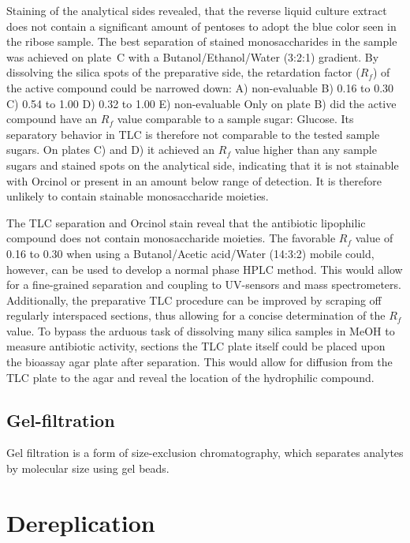 Staining of the analytical sides revealed, that the reverse liquid culture extract does not contain a significant amount of pentoses to adopt the blue color seen in the ribose sample.
The best separation of stained monosaccharides in the sample was achieved on plate~C with a Butanol/Ethanol/Water (3:2:1) gradient.
By dissolving the silica spots of the preparative side, the retardation factor ($R_f$) of the active compound could be narrowed down:
	 A) non-evaluable
	 B) 0.16 to 0.30
	 C) 0.54 to 1.00
	 D) 0.32 to 1.00
	 E) non-evaluable
Only on plate B) did the active compound have an $R_f$ value comparable to a sample sugar: Glucose.
Its separatory behavior in TLC is therefore not comparable to the tested sample sugars.
On plates C) and D) it achieved an $R_f$ value higher than any sample sugars and stained spots on the analytical side, indicating that it is not stainable with Orcinol or present in an amount below range of detection.
It is therefore unlikely to contain stainable monosaccharide moieties.

The TLC separation and Orcinol stain reveal that the antibiotic lipophilic compound does not contain monosaccharide moieties.
The favorable $R_f$ value of 0.16 to 0.30 when using a Butanol/Acetic acid/Water (14:3:2) mobile could, however, can be used to develop a normal phase HPLC method.
This would allow for a fine-grained separation and coupling to UV-sensors and mass spectrometers.
Additionally, the preparative TLC procedure can be improved by scraping off regularly interspaced sections, thus allowing for a concise determination of the $R_f$ value.
To bypass the arduous task of dissolving many silica samples in MeOH to measure antibiotic activity, sections the TLC plate itself could be placed upon the bioassay agar plate after separation.
This would allow for diffusion from the TLC plate to the agar and reveal the location of the hydrophilic compound.


\subsection{Gel-filtration} %
\label{sub:results_gel_filtration}

Gel filtration is a form of size-exclusion chromatography, which separates analytes by molecular size using gel beads.



\section{Dereplication} %
\label{sec:dereplication}


